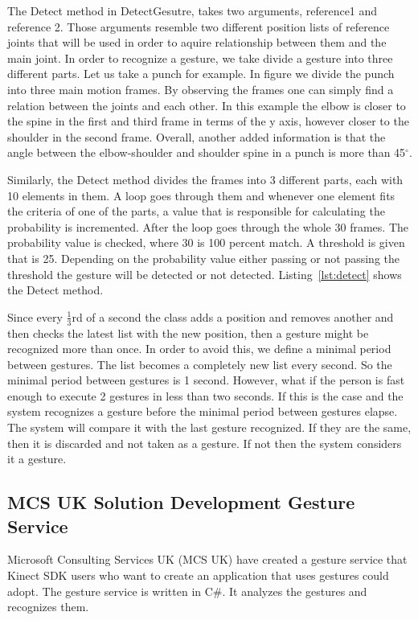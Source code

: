 The Detect method in DetectGesutre, takes two arguments, reference1 and reference 2. Those arguments resemble two different position lists of reference joints that will be used in order to aquire relationship between them and the main joint. In order to recognize a gesture, we take divide a gesture into three different parts. Let us take a punch for example. In figure %
we divide the punch into three main motion frames. By observing the frames one can simply find a relation between the joints and each other. In this example the elbow is closer to the spine in the first and third frame in terms of the y axis, however closer to the shoulder in the second frame. Overall, another added information is that the angle between the elbow-shoulder and shoulder spine in a punch is more than 45$^\circ$. 

Similarly, the Detect method divides the frames into 3 different parts, each with 10 elements in them. A loop goes through them and whenever one element fits the criteria of one of the parts, a value that is responsible for calculating the probability is incremented. After the loop goes through the whole 30 frames. The probability value is checked, where 30 is 100 percent match. A threshold is given that is 25. Depending on the probability value either passing or not passing the threshold the gesture will be detected or not detected. Listing~\ref{lst:detect} shows the Detect method.



Since every $\frac{1}{3}$rd of a second the class adds a position and removes another and then checks the latest list with the new position, then a gesture might be recognized more than once. In order to avoid this, we define a minimal period between gestures. The list becomes a completely new list every second. So the minimal period between gestures is 1 second. However, what if the person is fast enough to execute 2 gestures in less than two seconds. If this is the case and the system recognizes a gesture before the minimal period between gestures elapse. The system will compare it with the last gesture recognized. If they are the same, then it is discarded and not taken as a gesture. If not then the system considers it a gesture.

\subsection{MCS UK Solution Development Gesture Service \cite{citeKey3}}
Microsoft Consulting Services UK (MCS UK) have created a gesture service that Kinect SDK users who want to create an application that uses gestures could adopt. The gesture service is written in C\#. It analyzes the gestures and recognizes them.

